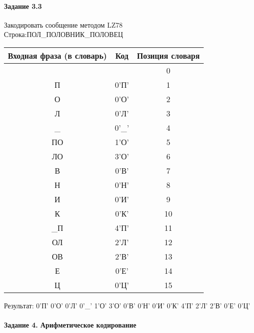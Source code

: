 \documentclass[a4paper, 12pt]{article}
\begin{document}
\paragraph{Задание 3.3}

Закодировать сообщение методом LZ78\\
Строка:ПОЛ\_ПОЛОВНИК\_ПОЛОВЕЦ\\
\begin{table}[h!]
\centering
\begin{tabular}{|c|c|c|} 
\hline
 Входная фраза (в словарь) & Код & Позиция словаря \\ \hline

 &  & 0 \\ \hline
П & 0'П' & 1 \\ \hline
О & 0'О' & 2 \\ \hline
Л & 0'Л' & 3 \\ \hline
\_ & 0'\_' & 4 \\ \hline
ПО & 1'О' & 5 \\ \hline
ЛО & 3'О' & 6 \\ \hline
В & 0'В' & 7 \\ \hline
Н & 0'Н' & 8 \\ \hline
И & 0'И' & 9 \\ \hline
К & 0'К' & 10 \\ \hline
\_П & 4'П' & 11 \\ \hline
ОЛ & 2'Л' & 12 \\ \hline
ОВ & 2'В' & 13 \\ \hline
Е & 0'Е' & 14 \\ \hline
Ц & 0'Ц' & 15 \\ \hline
\end{tabular}
\end{table}

Результат: 0'П' 0'О' 0'Л' 0'\_' 1'О' 3'О' 0'В' 0'Н' 0'И' 0'К' 4'П' 2'Л' 2'В' 0'Е' 0'Ц'\\
\pagebreak
\paragraph{Задание 4. Арифметическое кодирование\\}
\end{document}
